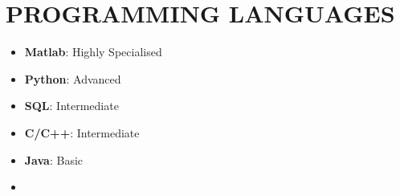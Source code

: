 \section*{{\faCode} PROGRAMMING LANGUAGES}
\vspace*{-0.5cm}
\begin{multicols}{2}
\begin{itemize}
\footnotesize
    \item \textbf{Matlab}: Highly Specialised
    \item \textbf{Python}: Advanced
    \item \textbf{SQL}: Intermediate
    \item \textbf{C/C++}: Intermediate
    \item \textbf{Java}: Basic
    \item[\vspace{\fill}]
\end{itemize}
\end{multicols}
